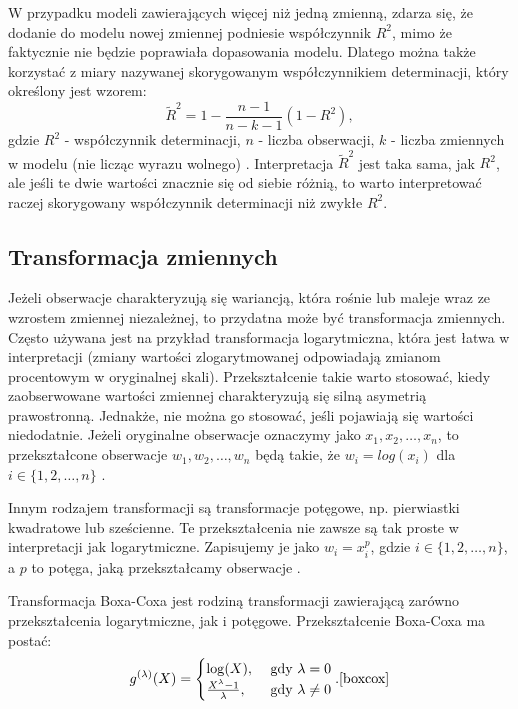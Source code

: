 \documentclass[12pt]{mwbk}
\theoremstyle{plain}
\theoremstyle{definition}
\theoremstyle{remark}
\begin{document}
W przypadku modeli zawierających więcej niż jedną zmienną, zdarza się, że dodanie do modelu nowej zmiennej podniesie współczynnik $R^2$, mimo że faktycznie nie będzie poprawiała dopasowania modelu. Dlatego można także korzystać z miary nazywanej skorygowanym współczynnikiem determinacji, który określony jest wzorem:
$$\tilde{R}^2=1-\frac{n-1}{n-k-1}(1-R^2),$$
gdzie $R^2$ - współczynnik determinacji, $n$ - liczba obserwacji, $k$ - liczba zmiennych w modelu (nie licząc wyrazu wolnego) \cite{skorygowany}. Interpretacja $\tilde{R}^2$ jest taka sama, jak $R^2$, ale jeśli te dwie wartości znacznie się od siebie różnią, to warto interpretować raczej skorygowany współczynnik determinacji niż zwykłe $R^2$.

\subsection{Transformacja zmiennych}

Jeżeli obserwacje charakteryzują się wariancją, która rośnie lub maleje wraz ze wzrostem zmiennej niezależnej, to przydatna może być transformacja zmiennych. Często używana jest na przykład transformacja logarytmiczna, która jest łatwa w interpretacji (zmiany wartości zlogarytmowanej odpowiadają zmianom procentowym w oryginalnej skali). Przekształcenie takie warto stosować, kiedy zaobserwowane wartości zmiennej charakteryzują się silną asymetrią prawostronną. Jednakże, nie można go stosować, jeśli pojawiają się wartości niedodatnie. Jeżeli oryginalne obserwacje oznaczymy jako $x_1, x_2,\ldots, x_n$, to przekształcone obserwacje $w_1, w_2,\ldots,w_n$ będą takie, że $w_i=log(x_i)$ dla $i \in \lbrace{1,2,\ldots,n\rbrace}$ \cite{forecasting}.

Innym rodzajem transformacji są transformacje potęgowe, np. pierwiastki kwadratowe lub sześcienne. Te przekształcenia nie zawsze są tak proste w interpretacji jak logarytmiczne. Zapisujemy je jako $w_i=x_i^p$, gdzie $i \in \lbrace{1,2,\ldots,n\rbrace}$, a $p$ to potęga, jaką przekształcamy obserwacje \cite{forecasting}.

Transformacja Boxa-Coxa jest rodziną transformacji zawierającą zarówno przekształcenia logarytmiczne, jak i potęgowe. Przekształcenie Boxa-Coxa ma postać:
$$g^{(\lambda)}(X)=\begin{cases}
\log(X), & \text{ gdy } \lambda=0 \\
\frac{X^{\lambda}-1}{\lambda},&\text{ gdy } \lambda \neq 0
\end{cases}. \cite{boxcox}$$
\end{document}
